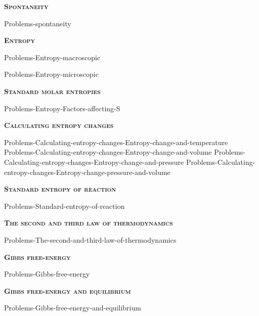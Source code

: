 \documentclass[main.tex]{subfiles}
\newcommand\chapterlabel{Ch-thermo}
\begin{document}
\newpage
\setdoublesep{0.35700 em}  %
\setatomsep{1.78500 em}    %
\setbondoffset{0.18265 em} %
\renewcommand{\bondwidth}{0.06642 em} %
\setbondstyle{line width = \bondwidth}
\fancyhfoffset[E,O]{0pt}
\setlength{\columnsep}{30pt}
\begin{conclusion}
\iftoggle{chem121}{}{\setcounter{chapter}{7}}
\end{conclusion}
\begin{multicols*}{2}\setcounter{numA}{1}  %

{\raggedright\textsc{\textbf{Spontaneity}}\par}
{Problems-spontaneity}


{\raggedright\textsc{\textbf{Entropy}}\par}
{Problems-Entropy-macroscopic}

{Problems-Entropy-microscopic}
{\raggedright\textsc{\textbf{Standard molar entropies}}\par}{Problems-Entropy-Factors-affecting-S}

{\raggedright\textsc{\textbf{Calculating entropy changes}}\par}{Problems-Calculating-entropy-changes-Entropy-change-and-temperature}
{Problems-Calculating-entropy-changes-Entropy-change-and-volume}
{Problems-Calculating-entropy-changes-Entropy-change-and-pressure}
  {Problems-Calculating-entropy-changes-Entropy-change-pressure-and-volume}

{\raggedright\textsc{\textbf{Standard entropy of reaction}}\par}{Problems-Standard-entropy-of-reaction}
{\raggedright\textsc{\textbf{The second and third law of thermodynamics}}\par}{Problems-The-second-and-third-law-of-thermodynamics}
{\raggedright\textsc{\textbf{Gibbs free-energy}}\par}{Problems-Gibbs-free-energy}
{\raggedright\textsc{\textbf{Gibbs free-energy and equilibrium}}\par}{Problems-Gibbs-free-energy-and-equilibrium}


\end{multicols*}
\end{document}
